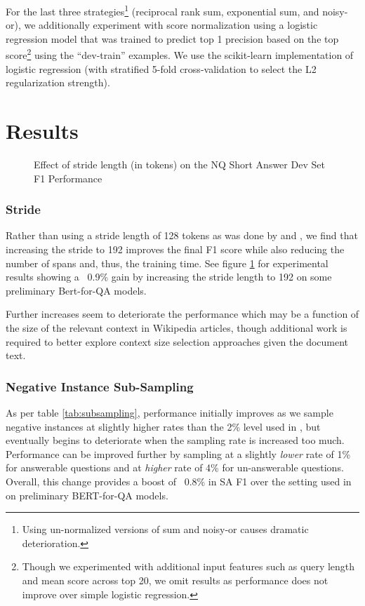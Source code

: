\documentclass[letterpaper]{article} \usepackage{aaai20}  \usepackage{times}  \usepackage{helvet} \usepackage{courier}  \usepackage[hyphens]{url}  \usepackage{graphicx} \urlstyle{rm} \def\UrlFont{\rm}  \usepackage{graphicx}  \frenchspacing  \setlength{\pdfpagewidth}{8.5in}  \setlength{\pdfpageheight}{11in}  \usepackage{amsmath}
\newcommand{\bertbase}{BERT}
\begin{document}
For the last three strategies\footnote{Using un-normalized versions of sum and noisy-or causes dramatic deterioration.} (reciprocal rank sum, exponential sum, and noisy-or), we additionally experiment with score normalization using a logistic regression model that was trained to predict top 1 precision based on the top score\footnote{Though we experimented with additional input features such as query length and mean score across top 20, we omit results as performance does not improve over simple logistic regression.} using the ``dev-train'' examples.  We use the scikit-learn \cite{scikit-learn} implementation of logistic regression (with stratified 5-fold cross-validation to select the L2 regularization strength).   \section{Results}
\label{sec:results}

\begin{figure}
\begin{center}
\end{center}
\caption{Effect of stride length (in tokens) on the NQ Short Answer Dev Set F1 Performance}
\label{fig:strides}
\end{figure}

\subsubsection{Stride} Rather than using a stride length of 128 tokens as was done by \cite{Devlin2018BERTPO} and \cite{alberti2019bert}, we find that increasing the stride to 192 improves the final F1 score while also reducing the number of spans and, thus, the training time. See figure \ref{fig:strides} for experimental results showing a ~0.9\% gain by increasing the stride length to 192 on some preliminary Bert-for-QA models. 
  
Further increases seem to deteriorate the performance which may be a function of the size of the relevant context in Wikipedia articles, though additional work is required to better explore context size selection approaches given the document text.

\subsubsection{Negative Instance Sub-Sampling} 
As per table \ref{tab:subsampling}, performance initially improves as we sample negative instances at slightly higher rates than the 2\% level used in \cite{alberti2019bert}, but eventually begins to deteriorate when the sampling rate is increased too much. Performance can be improved further by sampling at a slightly \textit{lower} rate of 1\% for answerable questions and at \textit{higher} rate of 4\% for un-answerable questions. Overall, this change provides a boost of ~0.8\% in SA F1 over the setting used in \cite{alberti2019bert} on preliminary \bertbase{}-for-QA models.
\end{document}
